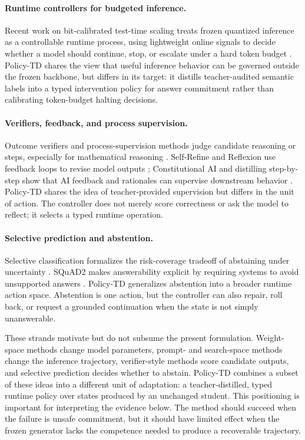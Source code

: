\documentclass[11pt]{article}
\newcommand{\policytd}{Policy-TD}
\begin{document}
\paragraph{Runtime controllers for budgeted inference.} Recent work on bit-calibrated test-time scaling treats frozen quantized inference as a controllable runtime process, using lightweight online signals to decide whether a model should continue, stop, or escalate under a hard token budget \cite{patarlapalli2026bitcal}. \policytd{} shares the view that useful inference behavior can be governed outside the frozen backbone, but differs in its target: it distills teacher-audited semantic labels into a typed intervention policy for answer commitment rather than calibrating token-budget halting decisions.

\paragraph{Verifiers, feedback, and process supervision.} Outcome verifiers and process-supervision methods judge candidate reasoning or steps, especially for mathematical reasoning \cite{cobbe2021training,lightman2023lets}. Self-Refine and Reflexion use feedback loops to revise model outputs \cite{madaan2023selfrefine,shinn2023reflexion}; Constitutional AI and distilling step-by-step show that AI feedback and rationales can supervise downstream behavior \cite{bai2022constitutional,hsieh2023distilling}. \policytd{} shares the idea of teacher-provided supervision but differs in the unit of action. The controller does not merely score correctness or ask the model to reflect; it selects a typed runtime operation.

\paragraph{Selective prediction and abstention.} Selective classification formalizes the risk-coverage tradeoff of abstaining under uncertainty \cite{geifman2017selective}. SQuAD2 makes answerability explicit by requiring systems to avoid unsupported answers \cite{rajpurkar2018know}. \policytd{} generalizes abstention into a broader runtime action space. Abstention is one action, but the controller can also repair, roll back, or request a grounded continuation when the state is not simply unanswerable.

These strands motivate but do not subsume the present formulation. Weight-space methods change model parameters, prompt- and search-space methods change the inference trajectory, verifier-style methods score candidate outputs, and selective prediction decides whether to abstain. \policytd{} combines a subset of these ideas into a different unit of adaptation: a teacher-distilled, typed runtime policy over states produced by an unchanged student. This positioning is important for interpreting the evidence below. The method should succeed when the failure is unsafe commitment, but it should have limited effect when the frozen generator lacks the competence needed to produce a recoverable trajectory.
\end{document}
